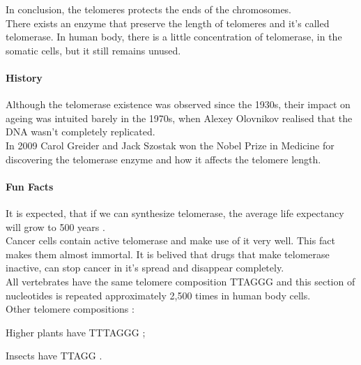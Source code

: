 \documentclass[paper=a4, fontsize=11pt]{scrartcl} %
\numberwithin{equation}{section} %
\numberwithin{figure}{section} %
\numberwithin{table}{section} %
\begin{document}
In conclusion, the telomeres protects the ends of the chromosomes.\\

There exists an enzyme that preserve the length of telomeres and it's called telomerase. In human body, there is a little concentration of telomerase, in the somatic cells, but it still remains unused.

\paragraph{ History }
Although the telomerase existence was observed since the 1930s, their impact on ageing was intuited barely in the 1970s, when Alexey Olovnikov realised that the DNA wasn't completely replicated.\\
In 2009 Carol Greider and Jack Szostak won the Nobel Prize in Medicine for discovering the telomerase enzyme and how it affects the telomere length.\\

\paragraph{ Fun Facts }

It is expected, that if we can synthesize telomerase, the average life expectancy will grow to 500 years .\\

Cancer cells contain active telomerase and make use of it very well. This fact makes them almost immortal. It is belived that drugs that make telomerase inactive, can stop cancer in it's spread and disappear completely.\\

All vertebrates have the same telomere composition TTAGGG and this section of nucleotides is repeated approximately 2,500 times in human body cells.\\

Other telomere compositions : 
\begin{list}{}{}

\item Higher plants have TTTAGGG ;
\item Insects have TTAGG .

\end{list}

\newpage
\end{document}
